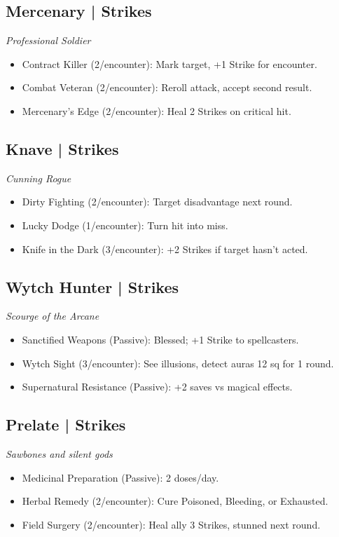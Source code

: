 \documentclass[10pt,twoside]{article}
\begin{document}
\begin{multicols}{2}
\subsection{Mercenary \;| Strikes}
\textit{Professional Soldier}
\begin{itemize}
\item Contract Killer (2/encounter): Mark target, +1 Strike for encounter.
\item Combat Veteran (2/encounter): Reroll attack, accept second result.
\item Mercenary's Edge (2/encounter): Heal 2 Strikes on critical hit.
\end{itemize}

\subsection{Knave \;| Strikes}
\textit{Cunning Rogue}
\begin{itemize}
\item Dirty Fighting (2/encounter): Target disadvantage next round.
\item Lucky Dodge (1/encounter): Turn hit into miss.
\item Knife in the Dark (3/encounter): +2 Strikes if target hasn't acted.
\end{itemize}

\subsection{Wytch Hunter \;| Strikes}
\textit{Scourge of the Arcane}
\begin{itemize}
\item Sanctified Weapons (Passive): Blessed; +1 Strike to spellcasters.
\item Wytch Sight (3/encounter): See illusions, detect auras 12 sq for 1 round.
\item Supernatural Resistance (Passive): +2 saves vs magical effects.
\end{itemize}

\subsection{Prelate \;| Strikes}
\textit{Sawbones and silent gods}
\begin{itemize}
\item Medicinal Preparation (Passive): 2 doses/day.
\item Herbal Remedy (2/encounter): Cure Poisoned, Bleeding, or Exhausted.
\item Field Surgery (2/encounter): Heal ally 3 Strikes, stunned next round.
\end{itemize}


\end{multicols}
\end{document}
